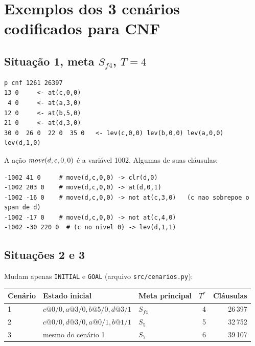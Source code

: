 \documentclass[11pt,a4paper]{article}
\begin{document}
\section{Exemplos dos 3 cenários codificados para CNF}
\subsection{Situação 1, meta $S_{f4}$, $T=4$}
\begin{lstlisting}
p cnf 1261 26397
13 0     <- at(c,0,0)
 4 0     <- at(a,3,0)
12 0     <- at(b,5,0)
21 0     <- at(d,3,0)
30 0  26 0  22 0  35 0   <- lev(c,0,0) lev(b,0,0) lev(a,0,0) lev(d,1,0)
\end{lstlisting}
A ação $\mathit{move}(d,c,0,0)$ é a variável 1002. Algumas de suas cláusulas:
\begin{lstlisting}
-1002 41 0     # move(d,c,0,0) -> clr(d,0)
-1002 203 0    # move(d,c,0,0) -> at(d,0,1)
-1002 -16 0    # move(d,c,0,0) -> not at(c,3,0)   (c nao sobrepoe o span de d)
-1002 -17 0    # move(d,c,0,0) -> not at(c,4,0)
-1002 -30 220 0  # (c no nivel 0) -> lev(d,1,1)
\end{lstlisting}
\subsection{Situações 2 e 3}
Mudam apenas \texttt{INITIAL} e \texttt{GOAL} (arquivo \texttt{src/cenarios.py}):
\begin{center}\small\begin{tabular}{@{}lllrr@{}}\toprule
Cenário & Estado inicial & Meta principal & $T^*$ & Cláusulas\\\midrule
1 & $c@0/0,a@3/0,b@5/0,d@3/1$ & $S_{f4}$ & 4 & 26\,397\\
2 & $c@0/0,d@3/0,a@0/1,b@1/1$ & $S_5$ & 5 & 32\,752\\
3 & mesmo do cenário 1 & $S_7$ & 6 & 39\,107\\\bottomrule
\end{tabular}\end{center}

\end{document}

